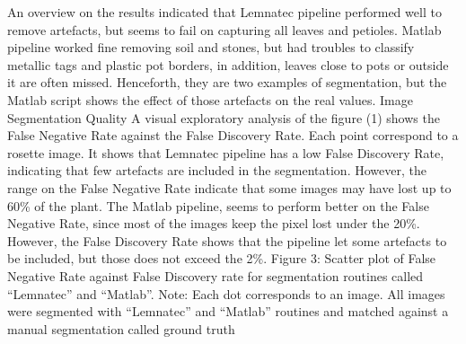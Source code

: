 \documentclass{frontiersSCNS} %
\begin{document}
An overview on the results indicated that Lemnatec pipeline performed well to remove artefacts, but seems to fail on capturing all leaves and petioles. Matlab pipeline worked fine removing soil and stones, but had troubles to classify metallic tags and plastic pot borders, in addition, leaves close to pots or outside it are often missed. Henceforth, they are two examples of segmentation, but the Matlab script shows the effect of those artefacts on the real values.
Image Segmentation Quality
A visual exploratory analysis of the figure (1) shows the False Negative Rate against the False Discovery Rate. Each point correspond to a rosette image. It shows that Lemnatec pipeline has a low False Discovery Rate, indicating that few artefacts are included in the segmentation. However, the range on the False Negative Rate indicate that some images may have lost up to 60\% of the plant. The Matlab pipeline, seems to perform better on the False Negative Rate, since most of the images keep the pixel lost under the 20\%. However, the False Discovery Rate shows that the pipeline let some artefacts to be included, but those does not exceed the 2\%. 
Figure 3: Scatter plot of False Negative Rate against False Discovery rate for segmentation routines called “Lemnatec” and “Matlab”. Note: Each dot corresponds to an image. All images were segmented with “Lemnatec” and “Matlab” routines and matched against a manual segmentation called ground truth
\end{document}
